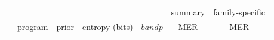 \documentclass[11pt]{article}
\newif\ifdraft
\begin{document}
\ifdraft
\begin{table}[htb]
\begin{center}
\begin{tabular}{ccccccc} 


\multicolumn{1}{c}{} & \multicolumn{1}{c}{} & \multicolumn{1}{c}{} &
\multicolumn{1}{c}{} & \multicolumn{1}{c}{} &
\multicolumn{1}{c}{summary} & \multicolumn{1}{c}{family-specific} \\

\multicolumn{1}{c}{} & \multicolumn{1}{c}{program} &
\multicolumn{1}{c}{prior} & \multicolumn{1}{c}{entropy (bits)} &
\multicolumn{1}{c}{$bandp$} & \multicolumn{1}{c}{MER} &
\multicolumn{1}{c}{MER} \\ \hline


\end{tabular}
\end{center}
\end{table}
\end{document}
